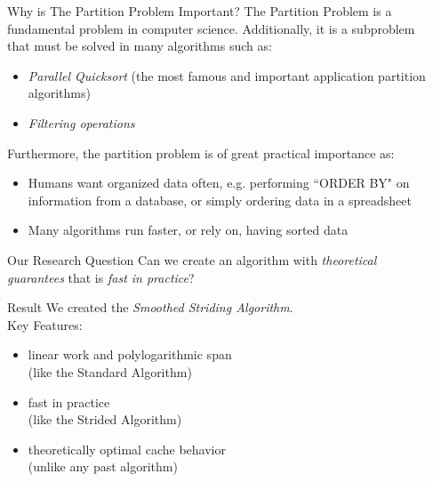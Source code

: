 \documentclass[table,serif,mathserif,final]{beamer}
\theoremstyle{remark}
\begin{document}
\begin{frame}{}
\begin{columns}[t]
\begin{column}{0.02\linewidth}
\end{column}

\begin{column}{0.2\linewidth}

\begin{block}{\Huge Why is The Partition Problem Important?}
  \justifying
  \Huge
  The Partition Problem is a fundamental problem in computer science. Additionally, it is a subproblem that must be solved in many algorithms such as:
  \begin{itemize}
    \item \emph{Parallel Quicksort} (the most famous and important application partition algorithms)
    \item \emph{Filtering operations}
  \end{itemize}
  Furthermore, the partition problem is of great practical importance as:
  \begin{itemize}
    \item Humans want organized data often, e.g. performing ``ORDER BY" on information from a database, or simply ordering data in a spreadsheet 
    \item Many algorithms run faster, or rely on, having sorted data 
  \end{itemize}
\end{block}
\vspace{0.5cm}

\begin{block}{\Huge Our Research Question}
  \justifying
  \Huge Can we create an algorithm with \emph{theoretical guarantees} that is \emph{fast in practice}?
\end{block}

\vspace{0.5cm}
\begin{block}{\Huge Result}
  \justifying
  \Huge We created the \emph{Smoothed Striding Algorithm}. \\
  Key Features:
	\begin{itemize}
		\item linear work and polylogarithmic span \\
			{\color{blue} (like the Standard Algorithm)\\}
		\vspace{0.15cm}
		\item fast in practice \\
			{\color{blue} (like the Strided Algorithm)\\}
	\vspace{0.15cm}
		\item theoretically optimal cache behavior \\
			{\color{blue} (unlike any past algorithm)}
	\end{itemize}
\end{block}


\end{column}
\end{columns}
\end{frame}
\end{document}
